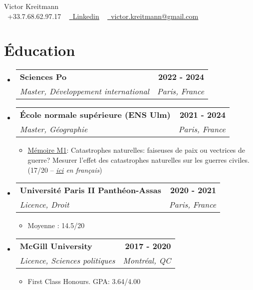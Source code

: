 \documentclass[a4paper,11pt]{article}
\makeatletter
\newcommand{\resumeItem}[1]{
  \item\small{
    {#1 \vspace{-2pt}}
  }
}
\newcommand{\resumeSubheading}[4]{
  \vspace{-2pt}\item
    \begin{tabular*}{1.00\textwidth}[t]{l@{\extracolsep{\fill}}r}
      \textbf{{\small #1}} & {\textbf{\small #2}} \\
      \textit{\small#3} & \textit{\small #4} \\
    \end{tabular*}\vspace{-7pt}
}
\newcommand{\resumeSubHeadingListStart}{\begin{itemize}[leftmargin=0.0in, label={}]}
\newcommand{\resumeSubHeadingListEnd}{\end{itemize}}
\newcommand{\resumeItemListStart}{\begin{itemize}}
\newcommand{\resumeItemListEnd}{\end{itemize}\vspace{-5pt}}
\makeatother
\begin{document}

\begin{center}
    {\Huge Victor Kreitmann} \\ \vspace{1pt}
    \small \raisebox{-0.1\height}\faPhone\ +33.7.68.62.97.17 ~
    \href{https://www.linkedin.com/in/victor-kreitmann/}{\raisebox{-0.2\height}\faLinkedin\ \underline{Linkedin}}  ~    
    \href{mailto:victor.kreitmann@gmail.com}{\raisebox{-0.2\height}\faEnvelope\  \underline{victor.kreitmann@gmail.com}} ~ 
    \vspace{0pt}
\end{center}




\section{Éducation}
  \resumeSubHeadingListStart
    \resumeSubheading
      {Sciences Po}{2022 - 2024}
      {Master, Développement international}{Paris, France}
      
      \resumeSubheading
      {École normale supérieure (ENS Ulm)}{2021 - 2024}
      {Master, Géographie}{Paris, France}
      \resumeItemListStart
      \resumeItem{\underline{Mémoire M1}: Catastrophes naturelles: faiseuses de paix ou vectrices de guerre? Mesurer l'effet des catastrophes naturelles sur les guerres civiles. (17/20 – \emph{\href{https://drive.google.com/file/d/1O6ke_2wZjExpSnBBnSKN7shPb0E3ZBgg/view?usp=sharing}{\underline{ici}} en français})}
      \resumeItemListEnd
      
      \resumeSubheading
      {Université Paris II Panthéon-Assas}{2020 - 2021}
      {Licence, Droit}{Paris, France}
      \resumeItemListStart
      \resumeItem{Moyenne : 14.5/20}
      \resumeItemListEnd
      
      \resumeSubheading
      {McGill University}{2017 - 2020}
      {Licence, Sciences politiques}{Montréal, QC}
      \resumeItemListStart
      \resumeItem{First Class Honours. GPA: 3.64/4.00}
      \resumeItemListEnd
  \resumeSubHeadingListEnd
\vspace{-10pt}
\end{document}
